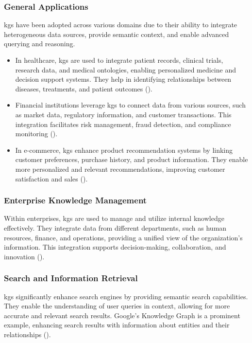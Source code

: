 \subsubsection*{General Applications}
\glspl{kg} have been adopted across various domains due to their ability to integrate heterogeneous data sources, provide semantic context, and enable advanced querying and reasoning.
\begin{itemize}
    \item In healthcare, \glspl{kg} are used to integrate patient records, clinical trials, research data, and medical ontologies, enabling personalized medicine and decision support systems. They help in identifying relationships between diseases, treatments, and patient outcomes (\cite{Kapanipathi2020}).
    \item Financial institutions leverage \glspl{kg} to connect data from various sources, such as market data, regulatory information, and customer transactions. This integration facilitates risk management, fraud detection, and compliance monitoring (\cite{Tchechmedjiev2019}).
    \item In e-commerce, \glspl{kg} enhance product recommendation systems by linking customer preferences, purchase history, and product information. They enable more personalized and relevant recommendations, improving customer satisfaction and sales (\cite{Zhang2021}).
\end{itemize}

\subsubsection*{Enterprise Knowledge Management}
Within enterprises, \glspl{kg} are used to manage and utilize internal knowledge effectively. They integrate data from different departments, such as human resources, finance, and operations, providing a unified view of the organization's information. This integration supports decision-making, collaboration, and innovation (\cite{pujara2013knowledge}).

\subsubsection*{Search and Information Retrieval}
\glspl{kg} significantly enhance search engines by providing semantic search capabilities. They enable the understanding of user queries in context, allowing for more accurate and relevant search results. Google's Knowledge Graph is a prominent example, enhancing search results with information about entities and their relationships (\cite{singhal2012introducing}).

